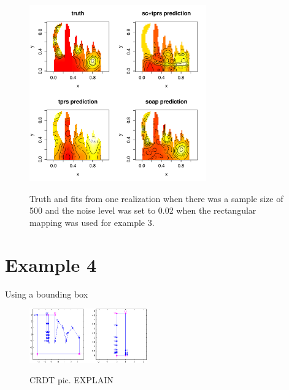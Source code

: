 \documentclass[a4paper,10pt]{amsart}
\begin{document}
\begin{figure}
\centering
\includegraphics[width=3in]{figs-otherdomains/wigglytop2-real.pdf} \\
\caption{Truth and fits from one realization when there was a sample size of 500 and the noise level was set to 0.02 when the rectangular mapping was used for example 3. }
\label{wigglytop2-real}
\end{figure}

\section{Example 4}

Using a bounding box


\begin{figure}
\centering
\includegraphics[width=2in]{figs-otherdomains/wigglytop2-bbox-numbered.png} \\
\caption{CRDT pic. EXPLAIN}
\label{wigglytop2-bbox-numbered}
\end{figure}
\end{document}
